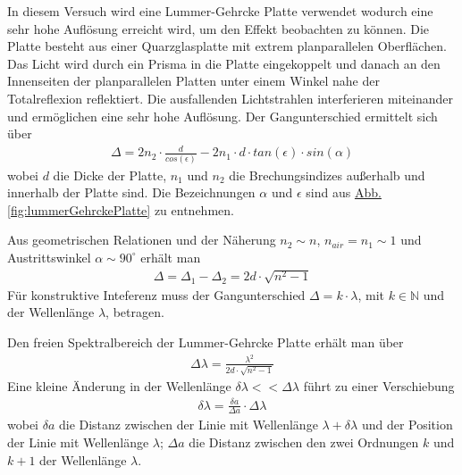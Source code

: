     In diesem Versuch wird eine Lummer-Gehrcke Platte verwendet wodurch eine sehr hohe Auflösung erreicht wird, um den Effekt beobachten zu können. Die Platte besteht aus einer Quarzglasplatte mit extrem planparallelen Oberflächen. Das Licht wird durch ein Prisma in die Platte eingekoppelt und danach an den Innenseiten der planparallelen Platten unter einem Winkel nahe der Totalreflexion reflektiert. Die ausfallenden Lichtstrahlen interferieren miteinander und ermöglichen eine sehr hohe Auflösung. Der Gangunterschied ermittelt sich über
    \begin{align}
    	\Delta = 2n_2 \cdot \frac{d}{cos(\epsilon)} - 2n_1 \cdot d \cdot tan(\epsilon) \cdot sin(\alpha)
    \end{align}
    wobei $d$ die Dicke der Platte, $n_1$ und $n_2$ die Brechungsindizes außerhalb und innerhalb der Platte sind. Die Bezeichnungen $\alpha$ und $\epsilon$ sind aus \hyperref[fig:lummerGehrckePlatte]{Abb. \ref*{fig:lummerGehrckePlatte}} zu entnehmen.

    Aus geometrischen Relationen und der Näherung $n_2 \sim n$, $n_{air} = n_1 \sim 1$ und Austrittswinkel $\alpha \sim 90^\circ$ erhält man
    \begin{align}
    	\Delta = \Delta_1 - \Delta_2 = 2d \cdot \sqrt{n^2 - 1}
    \end{align}
    Für konstruktive Inteferenz muss der Gangunterschied $\Delta = k \cdot \lambda$, mit $k \in \mathbb{N} $ und der Wellenlänge $\lambda$, betragen.

    Den freien Spektralbereich der Lummer-Gehrcke Platte erhält man über
    \begin{align}
    	\Delta \lambda = \frac{\lambda^2}{2d \cdot \sqrt{n^2 - 1}}
      \label{fml::1}
    \end{align}
    Eine kleine Änderung in der Wellenlänge $\delta \lambda << \Delta \lambda$ führt zu einer Verschiebung
    \begin{align}
    	\delta \lambda = \frac{\delta a}{\Delta a} \cdot \Delta \lambda
    \end{align}
    wobei $\delta a$ die Distanz zwischen der Linie mit Wellenlänge $\lambda + \delta \lambda$ und der Position der Linie mit Wellenlänge $\lambda$; $\Delta a$ die Distanz zwischen den zwei Ordnungen $k$ und $k + 1$ der Wellenlänge $\lambda$.

